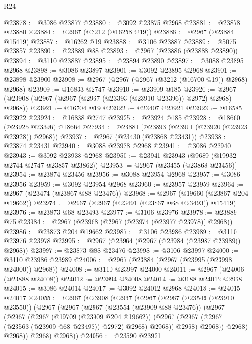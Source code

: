 \begin{lexlean}{R24}
\begin{coremodule}
@23878 := @3086 @23877
@23880 := @3092 @23875 @2968
@23881 := @23878 @23880
@23884 := @2967 (@3212 (@16258 @19))
@23886 := @2967 (@23884 @15419)
@23887 := @16262 @19
@23888 := @3106 @23887
@23889 := @5075 @23857
@23890 := @23889 @88
@23893 := @2967 (@23886 (@23888 @23890))
@23894 := @3110 @23887
@23895 := @23894 @23890
@23897 := @3088 @23895 @2968
@23898 := @3086 @23897
@23900 := @3092 @23895 @2968
@23901 := @23898 @23900
@23908 := @2967 (@2967 (@2967 (@3212 (@16700 @19)) @2968) @2968)
@23909 := @16833 @2747
@23910 := @23909 @185
@23920 := @2967 (@23908 (@2967 (@2967 (@2967 (@23393 (@23910 @23396)) @2972) @2968) @2968))
@23921 := @16704 @19
@23922 := @23407 @23921
@23923 := @16585 @23922
@23924 := @16838 @2747
@23925 := @23924 @185
@23928 := @18660 (@23925 @23396) @18664
@23934 := @23881 (@23893 (@23901 (@23920 (@23923 @23928)) @2968))
@23937 := @2967 (@23430 (@23868 @23431))
@23938 := @23874 @23431
@23940 := @3088 @23938 @2968
@23941 := @3086 @23940
@23943 := @3092 @23938 @2968
@23950 := @23941 @23943 (@9689 (@19932 @2744 @2747 @23857 @23862))
@23953 := @2967 (@23455 (@23868 @23456))
@23954 := @23874 @23456
@23956 := @3088 @23954 @2968
@23957 := @3086 @23956
@23959 := @3092 @23954 @2968
@23960 := @23957 @23959
@23964 := @2967 (@23474 (@23867 @88 @23476))
@23968 := @2967 (@19660 (@23867 @204 @19662))
@23974 := @2967 (@2967 (@23491 (@23867 @68 @23493)) @15419)
@23976 := @23873 @68 @23493
@23977 := @3106 @23976
@23978 := @23889 @75
@23984 := @2967 (@23968 (@2967 (@23974 (@23977 @23978)) @2968))
@23986 := @23873 @204 @19662
@23987 := @3106 @23986
@23989 := @3110 @23976 @23978
@23995 := @2967 (@23964 (@2967 (@23984 (@23987 @23989)) @2968))
@23997 := @23873 @88 @23476
@23998 := @3106 @23997
@24000 := @3110 @23986 @23989
@24006 := @2967 (@23884 (@2967 (@23995 (@23998 @24000)) @2968))
@24008 := @3110 @23997 @24000
@24011 := @2967 (@24006 (@23888 @24008))
@24012 := @23894 @24008
@24014 := @3088 @24012 @2968
@24015 := @3086 @24014
@24017 := @3092 @24012 @2968
@24018 := @24015 @24017
@24055 := @2967
    (@23908
      (@2967
        (@2967
          (@2967
            (@23549 (@23910 @23550))
            (@2967
              (@2967
                (@2967
                  (@23554 (@23909 @88 @23476))
                  (@2967
                    (@2967
                      (@2967
                        (@19709 (@23909 @204 @19662))
                        (@2967 (@2967 (@2967 (@23563 (@23909 @68 @23493)) @2972) @2968) @2968))
                      @2968)
                    @2968))
                @2968)
              @2968))
          @2968)
        @2968))
@24056 := @23590 @23921

\end{coremodule}
\end{lexlean}

